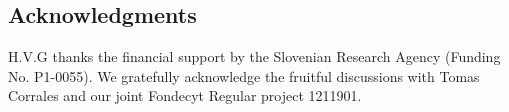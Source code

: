 \documentclass[letterpaper,compsoc,twoside]{IEEEtran}
\begin{document}
\subsection{Acknowledgments%
  \label{acknowledgments}%
}

H.V.G thanks the financial support by the Slovenian Research Agency (Funding No. P1-0055).
We gratefully acknowledge the fruitful discussions with Tomas Corrales and our joint Fondecyt Regular project 1211901. 


\end{document}
